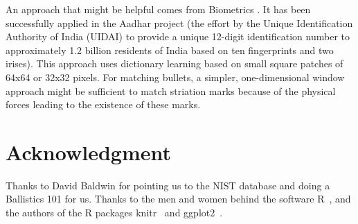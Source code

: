 \documentclass[aoas, preprint]{imsart}\usepackage[]{graphicx}\usepackage[]{color}
\newcommand{\hh}[1]{{\color{magenta} #1}}
\begin{document}

An approach that might be helpful comes from Biometrics \citep{jain:2015:tphil, jain:2015}. It has been successfully applied in the Aadhar project (the effort by the Unique Identification Authority of India (UIDAI) to provide a unique 12-digit identification number to approximately 1.2 billion residents of India based on ten fingerprints and two irises).
This approach uses dictionary learning based on small square patches  of 64x64 or 32x32 pixels. For matching bullets, a simpler, one-dimensional window approach might be sufficient to match striation marks because of the physical forces  leading to the existence of these marks.  

\section*{Acknowledgment} 
Thanks to David Baldwin for pointing us to the NIST database and doing a Ballistics 101 for us.
Thanks to the men and women behind the software R~\citep{R}, and the authors of the R packages  knitr~\citep{knitr} and ggplot2~\citep{ggplot2}.






\end{document}

